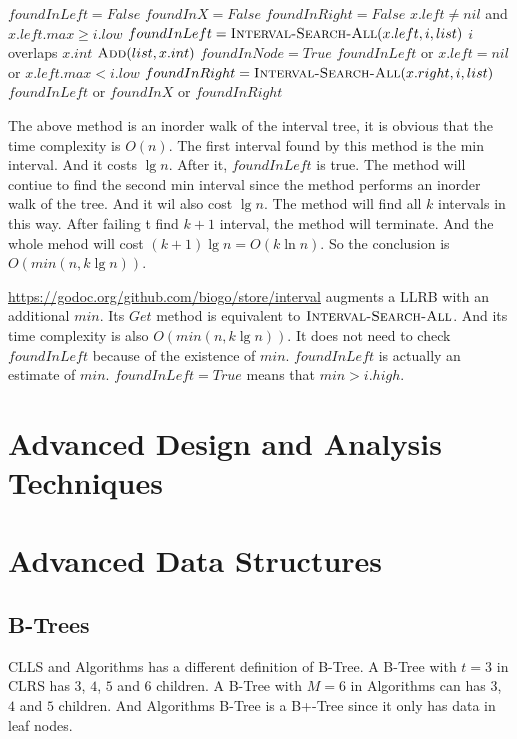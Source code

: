 \documentclass{book}
\begin{document}
\begin{CJK}{UTF8}{gkai}
\begin{codebox}
\li $foundInLeft = False$
\li $foundInX = False$
\li $foundInRight = False$
\li \If $x.left \ne nil$ and $x.left.max \ge i.low$
\li \Then $foundInLeft = \textnormal{\scshape Interval-Search-All}(x.left, i, list)$
\End
\li \If $i$ overlaps $x.int$
\li \Then $\textnormal{\scshape Add}(list, x.int)$
\li $foundInNode = True$
\End
\li \If $foundInLeft$ or $x.left = nil$ or $x.left.max < i.low$
\li \Then $foundInRight = \textnormal{\scshape Interval-Search-All}(x.right, i, list)$
\End
\li \Return $foundInLeft$ or $foundInX$ or $foundInRight$
\End
\end{codebox}

The above method is an inorder walk of the interval tree, it is obvious that the
time complexity is $O(n)$. The first interval found by this method is the min
interval. And it costs $\lg n$. After it, $foundInLeft$ is true. The method will
contiue to find the second min interval since the method performs an inorder walk
of the tree. And it wil also cost $\lg n$. The method will find all $k$
intervals in this way. After failing t find $k+1$ interval, the method will
terminate. And the whole mehod will cost $(k+1)\lg n = O(k\ln n)$. So the
conclusion is $O(min(n, k \lg n))$.

\url{https://godoc.org/github.com/biogo/store/interval} augments a LLRB with an
additional $min$. Its $Get$ method is equivalent to $\textnormal{\scshape Interval-Search-All}$.
And its time complexity is also $O(min(n, k \lg n))$. It does not need to check
$foundInLeft$ because of the existence of $min$. $foundInLeft$ is actually an
estimate of $min$. $foundInLeft = True$ means that $min > i.high$.

\part{Advanced Design and Analysis Techniques}
\part{Advanced Data Structures}
\chapter{B-Trees}
CLLS and Algorithms has a different definition of B-Tree. A B-Tree with 
$t=3$ in CLRS has $3$, $4$, $5$ and $6$ children. A B-Tree with $M=6$ in Algorithms 
can has $3$, $4$ and $5$ children. And Algorithms B-Tree is a B+-Tree since it only 
has data in leaf nodes.


\end{CJK}
\end{document}
